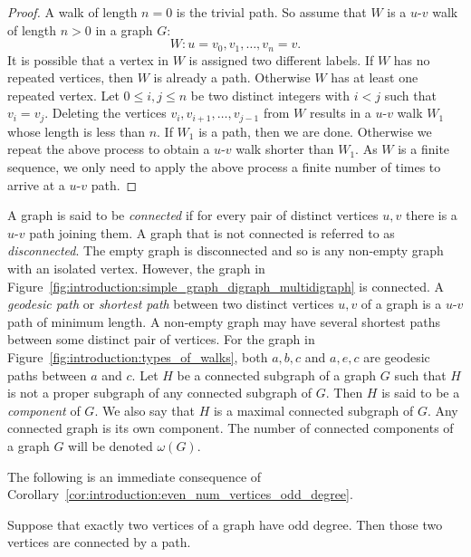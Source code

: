 \begin{proof}
A walk of length $n = 0$ is the trivial path. So assume that $W$ is a
$u$-$v$ walk of length $n > 0$ in a graph $G$:
\[
W: u = v_0, v_1, \dots, v_n = v.
\]
It is possible that a vertex in $W$ is assigned two different
labels. If $W$ has no repeated vertices, then $W$ is already a
path. Otherwise $W$ has at least one repeated vertex. Let
$0 \leq i,j \leq n$ be two distinct integers with $i < j$ such that
$v_i = v_j$. Deleting the vertices $v_i, v_{i+1}, \dots, v_{j-1}$ from
$W$ results in a $u$-$v$ walk $W_1$ whose length is less than $n$. If
$W_1$ is a path, then we are done. Otherwise we repeat the above
process to obtain a $u$-$v$ walk shorter than $W_1$. As $W$ is a
finite sequence, we only need to apply the above process a finite
number of times to arrive at a $u$-$v$ path.
\end{proof}

A graph is said to be
\emph{connected} if for
every pair of distinct vertices $u, v$ there is a $u$-$v$ path joining
them. A graph that is not connected is referred to as
\emph{disconnected}.
The empty graph is disconnected and so is any non-empty graph with an
isolated vertex. However, the graph in
Figure~\ref{fig:introduction:simple_graph_digraph_multidigraph} is
connected. A
\emph{geodesic path} or
\emph{shortest path} between two
distinct vertices $u,v$ of a graph is a $u$-$v$ path of minimum
length. A non-empty graph may have several shortest paths between some
distinct pair of vertices. For the graph in
Figure~\ref{fig:introduction:types_of_walks}, both $a,b,c$ and $a,e,c$
are geodesic paths between $a$ and $c$. Let $H$ be a connected
subgraph of a graph $G$ such that $H$ is not a proper subgraph of any
connected subgraph of $G$. Then $H$ is said to be a
\emph{component} of $G$. We also say that $H$ is a
maximal connected subgraph of $G$. Any connected graph is its own
component. The number of connected components of a graph $G$ will be
denoted $\omega(G)$\index{$\omega$}.

The following is an immediate consequence of
Corollary~\ref{cor:introduction:even_num_vertices_odd_degree}.

\begin{proposition}
Suppose that exactly two vertices of a graph have odd degree. Then
those two vertices are connected by a path.
\end{proposition}

